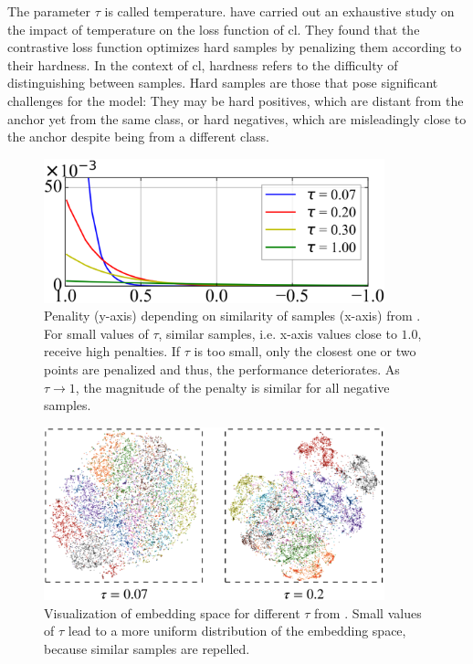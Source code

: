 The parameter $\tau$ is called temperature.
\citet{CL_temp_2021} have carried out an exhaustive study on the impact of temperature on the loss function of \ac{cl}.
They found that the contrastive loss function optimizes hard samples by penalizing them according to their hardness.
In the context of \ac{cl}, hardness refers to the difficulty of distinguishing between samples.
Hard samples are those that pose significant challenges for the model: 
They may be hard positives, which are distant from the anchor yet from the same class, 
or hard negatives, which are misleadingly close to the anchor despite being from a different class.

\begin{figure}[!htb] %
    \centering
    \includegraphics[width=280pt]{images/gradient_ratio_dep_on_temperature.png}
    \caption{Penality (y-axis) depending on similarity of samples (x-axis) from \citet{CL_temp_2021}. 
    For small values of $\tau$, similar samples, i.e. x-axis values close to $1.0$, receive high penalties.
    If $\tau$ is too small, only the closest one or two points are penalized and thus, the performance deteriorates.
    As $\tau \rightarrow 1$, the magnitude of the penalty is similar for all negative samples.
    }
    \label{fig:gradient_ratio_dep_on_temperature}
\end{figure}

\begin{figure}[!htb] %
    \centering
    \includegraphics[width=280pt]{images/tsne_dep_on_temperature.png}
    \caption{Visualization of embedding space for different $\tau$ from \citet{CL_temp_2021}.
    Small values of $\tau$ lead to a more uniform distribution of the embedding space, 
    because similar samples are repelled.
    }
    \label{fig:tsne_dep_on_temperature}
\end{figure}

